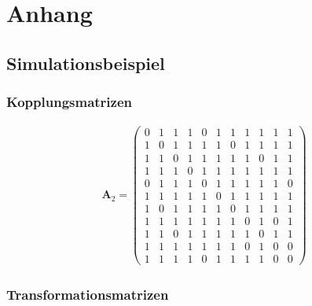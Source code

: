 \section*{Anhang}\label{anhang}
\subsection*{Simulationsbeispiel}
\subsubsection*{Kopplungsmatrizen} 
\begin{align*}
\boldsymbol{A}_2=
\begin{pmatrix}
0 & 1 & 1 & 1 & 0 & 1 & 1 & 1 & 1 & 1 & 1 \\
1 & 0 & 1 & 1 & 1 & 1 & 0 & 1 & 1 & 1 & 1 \\
1 & 1 & 0 & 1 & 1 & 1 & 1 & 1 & 0 & 1 & 1 \\
1 & 1 & 1 & 0 & 1 & 1 & 1 & 1 & 1 & 1 & 1 \\
0 & 1 & 1 & 1 & 0 & 1 & 1 & 1 & 1 & 1 & 0 \\
1 & 1 & 1 & 1 & 1 & 0 & 1 & 1 & 1 & 1 & 1 \\
1 & 0 & 1 & 1 & 1 & 1 & 0 & 1 & 1 & 1 & 1 \\
1 & 1 & 1 & 1 & 1 & 1 & 1 & 0 & 1 & 0 & 1 \\
1 & 1 & 0 & 1 & 1 & 1 & 1 & 1 & 0 & 1 & 1 \\
1 & 1 & 1 & 1 & 1 & 1 & 1 & 0 & 1 & 0 & 0 \\
1 & 1 & 1 & 1 & 0 & 1 & 1 & 1 & 1 & 0 & 0 
\end{pmatrix}
\end{align*}

\subsubsection*{Transformationsmatrizen} 